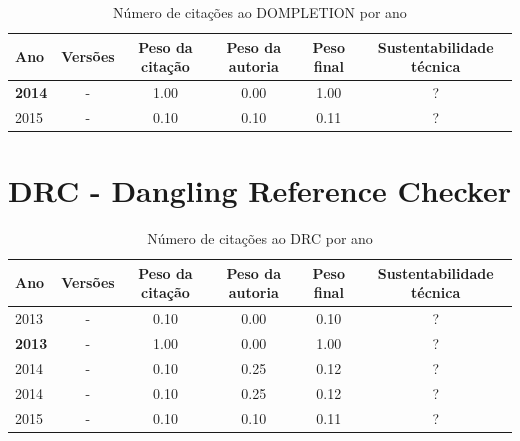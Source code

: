 \begin{table}[H]
\caption{Número de citações ao DOMPLETION por ano}
\centering
\begin{tabular}{| l | c | c | c | c | c |}
  \hline
  Ano & Versões & Peso da citação & Peso da autoria & Peso final & Sustentabilidade técnica \\
  \hline
            {\bf 2014}
          &
          -
          &
          1.00
          &
          0.00
          &
            {\color{blue} 1.00}
          &
          ?
          \\
\hline
            2015
          &
          -
          &
          0.10
          &
          0.10
          &
            {\color{red} 0.11}
          &
          ?
          \\
\hline
\end{tabular}
\end{table}



\section{DRC - Dangling Reference Checker}



\begin{table}[H]
\caption{Número de citações ao DRC  por ano}
\centering
\begin{tabular}{| l | c | c | c | c | c |}
  \hline
  Ano & Versões & Peso da citação & Peso da autoria & Peso final & Sustentabilidade técnica \\
  \hline
            2013
          &
          -
          &
          0.10
          &
          0.00
          &
            {\color{red} 0.10}
          &
          ?
          \\
            {\bf 2013}
          &
          -
          &
          1.00
          &
          0.00
          &
            {\color{blue} 1.00}
          &
          ?
          \\
\hline
            2014
          &
          -
          &
          0.10
          &
          0.25
          &
            {\color{red} 0.12}
          &
          ?
          \\
            2014
          &
          -
          &
          0.10
          &
          0.25
          &
            {\color{red} 0.12}
          &
          ?
          \\
\hline
            2015
          &
          -
          &
          0.10
          &
          0.10
          &
            {\color{red} 0.11}
          &
          ?
          \\
\hline
\end{tabular}
\end{table}



